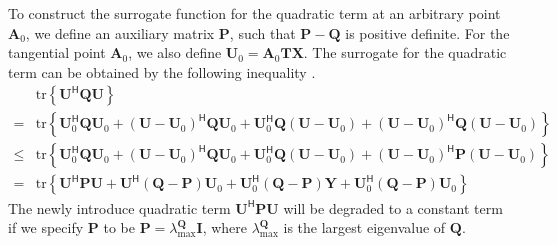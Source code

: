\documentclass[12pt,draftclsnofoot,onecolumn,journal]{IEEEtran}
\begin{document}
To construct the surrogate function for the quadratic term at an arbitrary point $\mathbf A_0$, we define an auxiliary matrix $\mathbf P$, such that $\mathbf P-\mathbf Q$ is positive definite. For the tangential point $\mathbf A_0$, we also define $\mathbf U_0=  \mathbf A_0\mathbf{TX}$. The surrogate for the quadratic term can be obtained by the following inequality \cite{sankuru2020designing}.
\begin{equation}
\begin{split}
	&\mathrm{tr}\left\{\mathbf U^{\mathsf H}\mathbf Q \mathbf U\right\}\\
=	&\mathrm{tr}\left\{\mathbf U_0^{\mathsf H} \mathbf Q \mathbf U_0+(\mathbf U-\mathbf U_0)^{\mathsf H} \mathbf Q\mathbf U_0+\mathbf U_0^{\mathsf H} \mathbf Q(\mathbf U-\mathbf U_0)+(\mathbf U-\mathbf U_0)^{\mathsf H}\mathbf Q(\mathbf U-\mathbf U_0)\right\}\\
\leq&\mathrm{tr}\left\{\mathbf U_0^{\mathsf H} \mathbf Q \mathbf U_0+(\mathbf U-\mathbf U_0)^{\mathsf H} \mathbf Q\mathbf U_0+\mathbf U_0^{\mathsf H} \mathbf Q(\mathbf U-\mathbf U_0)+(\mathbf U-\mathbf U_0)^{\mathsf H}\mathbf P(\mathbf U-\mathbf U_0)\right\}\\
=	&\mathrm{tr}\left\{\mathbf U^{\mathsf H}\mathbf P\mathbf U+\mathbf U^{\mathsf H}(\mathbf Q-\mathbf P)\mathbf U_0+ \mathbf U_0^{\mathsf H}(\mathbf Q-\mathbf P)\mathbf Y+\mathbf U_0^{\mathsf H}(\mathbf Q-\mathbf P)\mathbf U_0\right\}
\label{eq:mmconstr}
\end{split}
\end{equation}
The newly introduce quadratic term $\mathbf U^{\mathsf H}\mathbf P\mathbf U$ will be degraded to a constant term if we specify $\mathbf P$ to be $\mathbf P=\lambda_{\mathrm{max}}^{\mathbf Q}\mathbf I$, where $\lambda_{\mathrm{max}}^{\mathbf Q}$ is the largest eigenvalue of $\mathbf Q$. 
\end{document}
